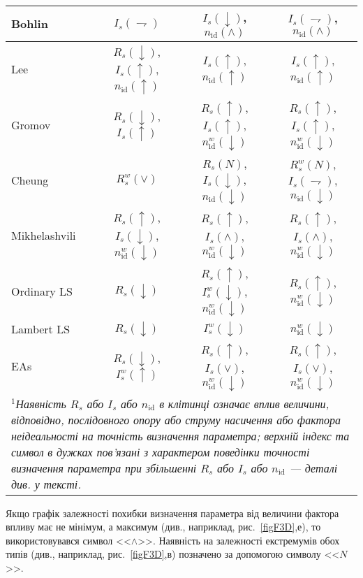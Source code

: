 \begin{table}
\begin{tabular}{|l|c|c|c|}
\hline
Bohlin &$I_s(\rightharpoondown)$&$I_s(\downarrow)$, $n_\mathrm{id}(\wedge)$& $I_s(\rightharpoondown)$, $n_\mathrm{id}(\wedge)$\\
\hline
Lee &$R_s(\downarrow)$, $I_s(\uparrow)$, $n_\mathrm{id}(\uparrow)$&$I_s(\uparrow)$, $n_\mathrm{id}(\uparrow)$& $I_s(\uparrow)$, $n_\mathrm{id}(\uparrow)$\\
\hline
Gromov &$R_s(\downarrow)$, $I_s(\uparrow)$&$R_s(\uparrow)$, $I_s(\uparrow)$, $n_\mathrm{id}^w(\downarrow)$&$R_s(\uparrow)$, $I_s(\uparrow)$, $n_\mathrm{id}^w(\downarrow)$\\
\hline
Cheung &$R_s^w(\vee)$&$R_s(N)$, $I_s(\downarrow)$, $n_\mathrm{id}(\downarrow)$&$R_s^w(N)$, $I_s(\rightharpoondown)$, $n_\mathrm{id}(\downarrow)$\\
\hline
Mikhelashvili &$R_s(\uparrow)$, $I_s(\downarrow)$, $n_\mathrm{id}^w(\downarrow)$&$R_s(\uparrow)$, $I_s(\wedge)$, $n_\mathrm{id}^w(\downarrow)$&$R_s(\uparrow)$, $I_s(\wedge)$, $n_\mathrm{id}^w(\downarrow)$\\
\hline
Ordinary LS &$R_s(\downarrow)$&$R_s(\uparrow)$, $I_s^w(\downarrow)$, $n_\mathrm{id}^w(\downarrow)$&$R_s(\uparrow)$, $n_\mathrm{id}^w(\downarrow)$\\
\hline
Lambert LS &$R_s(\downarrow)$&$I_s^w(\downarrow)$&$n_\mathrm{id}^w(\downarrow)$\\
\hline
EAs &$R_s(\downarrow)$, $I_s^w(\uparrow)$&$R_s(\uparrow)$, $I_s(\vee)$, $n_\mathrm{id}^w(\downarrow)$&$R_s(\uparrow)$, $I_s(\vee)$, $n_\mathrm{id}^w(\downarrow)$\\
\hline
\multicolumn{4}{p{0.9\textwidth}}{$^{1}$\textit{Наявність $R_s$ або $I_s$ або $n_\mathrm{id}$ в клітинці означає
вплив величини, відповідно, послідовного опору або струму насичення або фактора неідеальності на точність визначення параметра;
верхній індекс та символ в дужках пов'язані з характером поведінки точності визначення параметра при збільшенні $R_s$ або $I_s$ або $n_\mathrm{id}$ --- деталі див. у тексті.
}}\\
\end{tabular}
\end{table}



Якщо графік залежності похибки визначення параметра від величини фактора впливу має не мінімум, а максимум (див., наприклад, рис.~\ref{figF3D},е),
то використовувався символ <<$\wedge$>>.
Наявність на залежності екстремумів обох типів (див., наприклад, рис.~\ref{figF3D},в) позначено за допомогою символу <<$N$>>.

